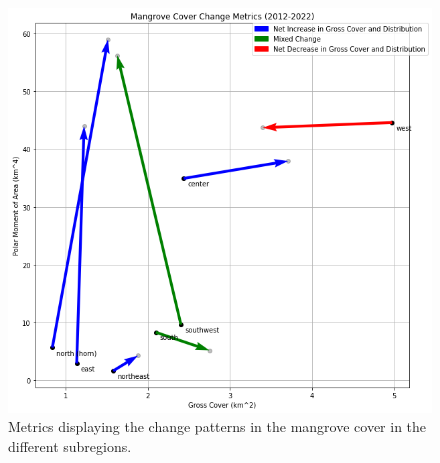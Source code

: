 \documentclass[journal,article,submit,pdftex,moreauthors]{Definitions/mdpi}
\begin{document}
\begin{figure}[H]
\includegraphics[width=13.5 cm]{Figures/mangrove_change_metric.png}
\caption{Metrics displaying the change patterns in the mangrove cover in the different subregions. \label{fig2}}
\end{figure}  
\end{document}
